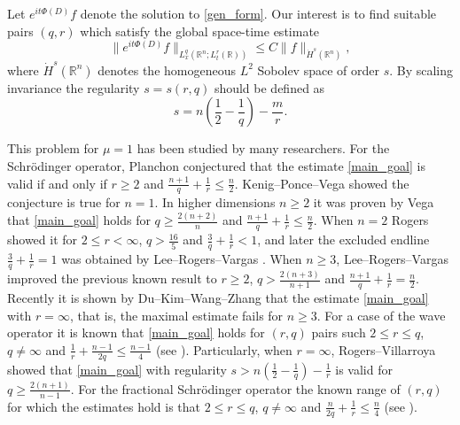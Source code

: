 \documentclass[11pt,reqno]{amsart}
\theoremstyle{plain}
\theoremstyle{definition}
\theoremstyle{remark}
\numberwithin{equation}{section}
\begin{document}
Let $e^{it\Phi(D)}f$ denote the solution to \eqref{gen_form}.  
Our interest  is to find suitable pairs $(q,r)$ which satisfy the global space-time estimate
    \begin{equation}\label{main_goal}
    \|e^{it\Phi(D)} f\|_{L_x^q(\mathbb R^n; L_t^r(\mathbb R))}
    \le C \|f\|_{\dot H^s(\mathbb R^n)},
    \end{equation}
where $\dot H^s(\mathbb R^n)$ denotes the homogeneous $L^2$ Sobolev space of order $s$.
By scaling invariance the regularity $s=s(r,q)$ should be defined as
\begin{equation} \label{regularity}
s = n(\frac{1}{2} - \frac{1}{q}) -\frac{m}{r}.
\end{equation} 

This problem for $\mu =1$ has been studied by many researchers. For the Schr\"odinger operator, 
Planchon \cite{Pl} conjectured that the estimate \eqref{main_goal} is valid if and only if $r \ge 2$ and $\frac{n+1}{q} + \frac{1}{r} \le \frac{n}{2}$.
Kenig--Ponce--Vega \cite{KPV} showed the conjecture is true for $n=1$. In higher dimensions $n \ge 2$ it was proven by Vega \cite{V1} that \eqref{main_goal} holds for $q \ge \frac{2(n+2)}{n}$ and $\frac{n+1}{q} + \frac{1}{r} \le \frac{n}{2}$. When $n=2$ Rogers \cite{R} showed it for $2\le r < \infty$, $q > \frac{16}5$ and $\frac{3}{q} + \frac{1}{r} < 1$, and later the excluded endline $\frac{3}{q} + \frac{1}{r} = 1$ was obtained by Lee--Rogers--Vargas \cite{LRV}. When $n \ge 3$,  Lee--Rogers--Vargas \cite{LRV} improved the previous known result to $r \ge 2$, $q > \frac{2(n+3)}{n+1}$ and $\frac{n+1}{q} + \frac{1}{r} = \frac{n}{2}$. 
Recently it is shown by Du--Kim--Wang--Zhang \cite{DKWZ} that  the estimate \eqref{main_goal} with $r=\infty$, that is, the maximal estimate fails for $n \ge 3$. 
For a case of the wave operator it is known that  \eqref{main_goal} holds for $(r,q)$ pairs such  $2 \le r \le q$, $q \neq \infty$ and $\frac{1}{r} + \frac{n-1}{2q} \le \frac{n-1}{4}$ (see \cites{GV, KT, Pe, S}). Particularly, when $r=\infty$, Rogers--Villarroya \cite{RV} showed that \eqref{main_goal} with regularity $s> n(\frac{1}{2} - \frac{1}{q})-\frac{1}{r}$ is valid for $q \ge \frac{2(n+1)}{n-1}$.
For the fractional Schr\"odinger operator the known range of $(r,q)$ for which the estimates hold is that $2 \le r \le q$, $q \neq \infty$ and $\frac{n}{2q} + \frac{1}{r} \le \frac{n}{4}$ (see \cites{C,T2,Pa,CHKL,CO}).
\end{document}
